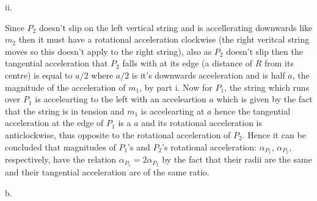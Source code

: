 \documentclass[12pt]{article}
\begin{document}
    \vspace{12pt}

    ii.

    \vspace{12pt}

    Since \(P_2\) doesn't slip on the left vertical string and is accellerating downwards like \(m_2\) then it must have a rotational acceleration clockwise (the right veritcal string moves so this doesn't apply to the right string), also as \(P_2\) doesn't slip then the tangential acceleration that \(P_2\) falls with at its edge (a distance of \(R\) from its centre) is equal to \(a/2\) where \(a/2\) is it's downwards acceleration and is half \(a\), the magnitude of the acceleration of \(m_1\), by part i. Now for \(P_1\), the string which runs over \(P_1\) is accelearting to the left with an acceleartion \(a\) which is given by the fact that the string is in tension and \(m_1\) is accelearting at \(a\) hence the tangential acceleration at the edge of \(P_1\) is a \(a\) and its rotational acceleration is anticlockwise, thus opposite to the rotational acceleration of \(P_2\). Hence it can be concluded that magnitudes of \(P_1\)'s and \(P_2\)'s rotational acceleration: \(\alpha_{P_1}\), \(\alpha_{P_2}\), respectively, have the relation \(\alpha_{P_1}=2\alpha_{P_2}\) by the fact that their radii are the same and their tangential acceleration are of the same ratio.

    \vspace{12pt}

    b.
\end{document}
